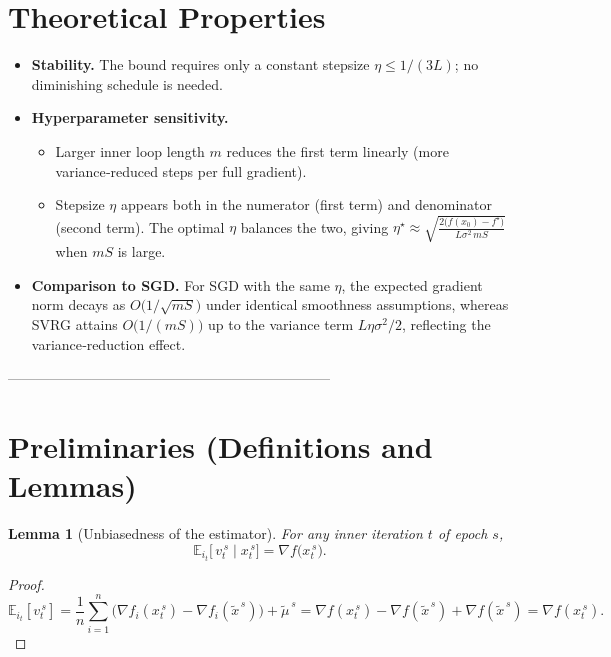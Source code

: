\documentclass{article}
\newtheorem{lemma}{Lemma}
\newcommand{\E}{\mathbb{E}}
\begin{document}
\section*{Theoretical Properties}
\begin{itemize}
    \item \textbf{Stability.} The bound requires only a constant stepsize $\eta\le1/(3L)$; no diminishing schedule is needed.
    \item \textbf{Hyperparameter sensitivity.}
    \begin{itemize}
        \item Larger inner loop length $m$ reduces the first term linearly (more variance‑reduced steps per full gradient).
        \item Stepsize $\eta$ appears both in the numerator (first term) and denominator (second term). The optimal $\eta$ balances the two, giving $\eta^\star\approx\sqrt{\frac{2\bigl(f(x_0)-f^\star\bigr)}{L\sigma^2\,mS}}$ when $mS$ is large.
    \end{itemize}
    \item \textbf{Comparison to SGD.} For SGD with the same $\eta$, the expected gradient norm decays as $O\!\bigl(1/\sqrt{mS}\bigr)$ under identical smoothness assumptions, whereas SVRG attains $O\!\bigl(1/(mS)\bigr)$ up to the variance term $L\eta\sigma^2/2$, reflecting the variance‑reduction effect.
\end{itemize}

---------------------------------------------------------------------

\section*{Preliminaries (Definitions and Lemmas)}
\begin{lemma}[Unbiasedness of the estimator]\label{lem:unbiased}
For any inner iteration $t$ of epoch $s$,
\[
\E_{i_t}\!\bigl[\,v_t^{\,s}\mid x_t^{\,s}\bigr]=\nabla f\!\bigl(x_t^{\,s}\bigr).
\]
\end{lemma}
\begin{proof}
\[
\E_{i_t}[v_t^{\,s}]
= \frac1n\sum_{i=1}^{n}\bigl(\nabla f_i(x_t^{\,s})-\nabla f_i(\tilde{x}^{\,s})\bigr)+\tilde{\mu}^{\,s}
= \nabla f(x_t^{\,s})-\nabla f(\tilde{x}^{\,s})+\nabla f(\tilde{x}^{\,s})
= \nabla f(x_t^{\,s}).
\tag*{\qedhere}
\]
\end{proof}
\end{document}
